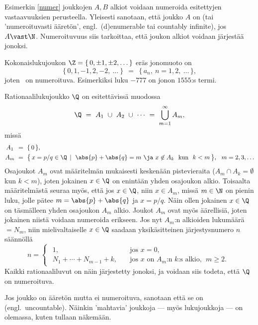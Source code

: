Esimerkin \ref{numer} joukkojen $A,B$ alkiot voidaan numeroida esitettyjen vastaavuuksien 
perusteella. Yleisesti sanotaan, että joukko $A$ on  
(tai 'numeroituvasti ääretön', engl.\ (d)enumerable tai countably infinite), jos $A \vast \N$.
Numeroituvuus siis tarkoittaa, että joukon alkiot voidaan järjestää jonoksi.
\begin{Exa} Kokonaislukujoukon $\Z = \{\,0,\pm 1, \pm 2, \ldots\, \}$ eräs jonomuoto on
\[
\{\,0,1,-1,2,-2,\ \ldots\ \}\ \ =\ \ \{\,a_n,\ n = 1,2,\ \ldots\,\},
\]
joten \Z\ on numeroituva. Esimerkiksi luku $-777$ on jonon $1555$:s termi. \loppu 
\end{Exa}
\begin{Exa} Rationaalilukujoukko $\Q$ on esitettävissä muodossa
\[
\Q\ =\ A_1\ \cup\ A_2\ \cup\ \cdots\ = \ \bigcup_{m=1}^{\infty} A_m,
\]
missä
\begin{align*}
A_1\,\ &=\ \{\,0\,\}, \\
A_m\   &=\ \bigl\{\,x = p/q \in \Q\,\mid\ \abs{p} + \abs{q} 
                      = m\ \ja\ x \not\in A_k\ \ \text{kun}\ \ k<m\,\bigr\}, \ \ m = 2,3, \ldots
\end{align*}
Osajoukot $A_m$ ovat määritelmän mukaisesti keskenään pistevieraita 
(\mbox{$A_m \cap A_k = \emptyset$} kun $k<m$), joten jokainen $x \in \Q$ on enintään yhden 
osajoukon alkio. Toisaalta määritelmästä seuraa myös, että jos $x \in \Q$, niin $x \in A_m$, 
missä $m\in\N$ on pienin luku, jolle pätee $m = \abs{p} + \abs{q}$ ja $x = p/q$. Näin ollen 
jokainen $x\in\Q$ on täsmälleen yhden osajoukon $A_m$ alkio. Joukot $A_m$ ovat myös äärellisiä,
joten jokainen niistä voidaan numeroida erikseen. Jos nyt $A_m$:n alkioiden lukumäärä $= N_m$,
niin mielivaltaiselle $x\in\Q$ saadaan yksikäsitteinen järjestysnumero $n$ säännöllä
\[
n = \begin{cases} \begin{aligned}
    1,\  \qquad\qquad\qquad\qquad\quad &\text{jos $x=0$}, \\
    N_1 + \cdots + N_{m-1} + k, \quad  &\text{jos $x$ on $A_m$:n $k$:s alkio},\ \ m \ge 2.
                  \end{aligned}
    \end{cases}
\]
Kaikki rationaaliluvut on näin järjestetty jonoksi, ja voidaan siis todeta, että $\Q$ on 
numeroituva. \loppu 
\end{Exa}

Jos joukko on ääretön mutta ei numeroituva, sanotaan että se on 
%
 (engl.\ uncountable). Näinkin 'mahtavia' joukkoja --- myös lukujoukkoja ---
on olemassa, kuten tullaan näkemään.

